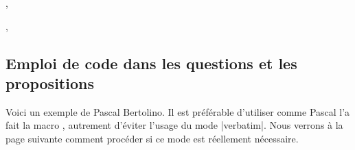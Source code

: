 \begin{tkzexample}[vbox]
\begin{alterqcm}[lq=8cm,numprop=true,sep]
{{\hspace{1cm}  \begin{minipage}{5cm}  \end{minipage}},
{\hspace{1cm}  \begin{minipage}{5cm}  \end{minipage}},
{\hspace{1cm}  \begin{minipage}{5cm}  \end{minipage} }}
\end{alterqcm} 
\end{tkzexample}

\subsection{Emploi de code  dans les questions et les propositions} 

Voici un exemple de Pascal Bertolino. Il est préférable d'utiliser comme Pascal l'a fait la macro , autrement d'éviter l'usage du mode 
|verbatim|. Nous verrons à la page suivante comment procéder si ce mode est réellement nécessaire.

